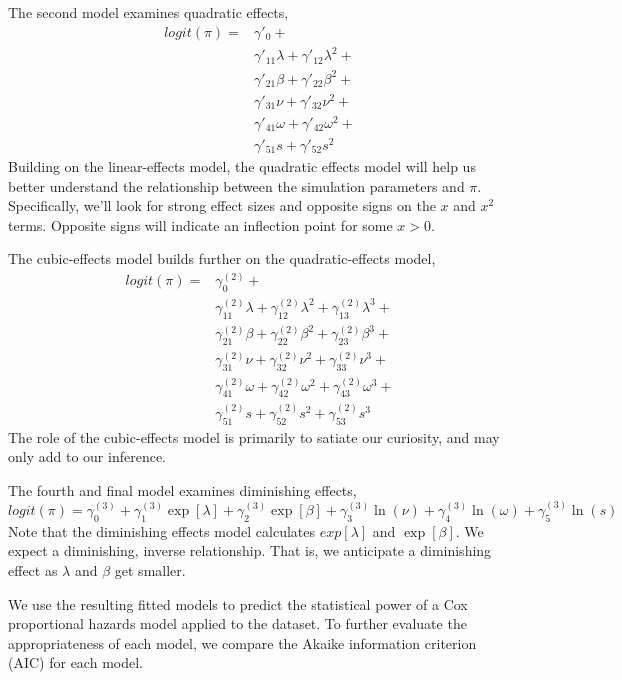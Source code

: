 The second model examines quadratic effects,
%
\begin{equation}
\begin{aligned}
    logit(\pi) = & \gamma'_{0} + \\ &
        \gamma'_{11} \lambda + 
        \gamma'_{12} \lambda^2 +  \\ &
        \gamma'_{21} \beta +
        \gamma'_{22} \beta^2 + \\ &
        \gamma'_{31} \nu + 
        \gamma'_{32} \nu^2 +  \\ &
        \gamma'_{41} \omega +
        \gamma'_{42} \omega^2 + \\ &
        \gamma'_{51} s +
        \gamma'_{52} s^2
\end{aligned}
\end{equation}
%
Building on the linear-effects model, the quadratic effects model will help us better understand the relationship between the simulation parameters and $\pi$. Specifically, we'll look for strong effect sizes and opposite signs on the $x$ and $x^2$ terms. Opposite signs will indicate an inflection point for some $x > 0$. 

The cubic-effects model builds further on the quadratic-effects model,
%
\begin{equation}
\begin{aligned}
    logit(\pi) = &  \gamma^{(2)}_{0} + \\ &
        \gamma^{(2)}_{11} \lambda + 
        \gamma^{(2)}_{12} \lambda^2 + 
        \gamma^{(2)}_{13} \lambda^3 + \\ &
        \gamma^{(2)}_{21} \beta +
        \gamma^{(2)}_{22} \beta^2 +
        \gamma^{(2)}_{23} \beta^3 + \\ &
        \gamma^{(2)}_{31} \nu + 
        \gamma^{(2)}_{32} \nu^2 + 
        \gamma^{(2)}_{33} \nu^3 + \\ &
        \gamma^{(2)}_{41} \omega +
        \gamma^{(2)}_{42} \omega^2 +
        \gamma^{(2)}_{43} \omega^3 + \\ &
        \gamma^{(2)}_{51} s +
        \gamma^{(2)}_{52} s^2 +
        \gamma^{(2)}_{53} s^3
\end{aligned}
\end{equation}
%
The role of the cubic-effects model is primarily to satiate our curiosity, and may only add to our inference. 

The fourth and final model examines diminishing effects,
%
\begin{equation}
    logit(\pi)  = \gamma^{(3)}_{0} + 
        \gamma^{(3)}_{1} \exp[\lambda] + 
        \gamma^{(3)}_{2} \exp[\beta] + 
        \gamma^{(3)}_{3} \ln(\nu) +
        \gamma^{(3)}_{4} \ln(\omega) +
        \gamma^{(3)}_{5} \ln(s)
\end{equation}
%
Note that the diminishing effects model calculates $exp[\lambda]$ and $\exp[\beta]$. We expect a diminishing, inverse relationship. That is, we anticipate a diminishing effect as $\lambda$ and $\beta$ get smaller. 

We use the resulting fitted models to predict the statistical power of a Cox proportional hazards model applied to the dataset. To further evaluate the appropriateness of each model, we compare the Akaike information criterion (AIC) \cite{hyndman, sakamoto} for each model. 
